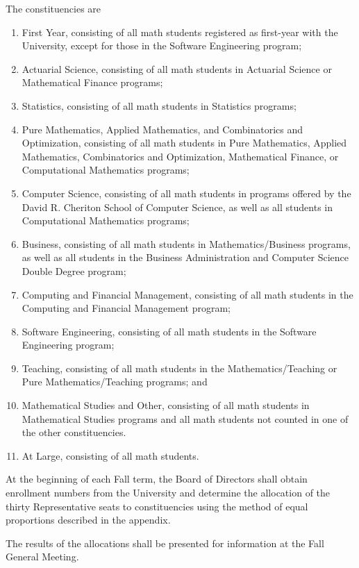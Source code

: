 The constituencies are
\begin{enumerate}
  \item First Year, consisting of all math students registered as first-year
    with the University, except for those in the Software Engineering program;
  \item Actuarial Science, consisting of all math students in Actuarial Science
    or Mathematical Finance programs;
  \item Statistics, consisting of all math students in Statistics programs;
  \item Pure Mathematics, Applied Mathematics, and Combinatorics and
    Optimization, consisting of all math students in Pure Mathematics, Applied
    Mathematics, Combinatorics and Optimization, Mathematical Finance, or
    Computational Mathematics programs;
  \item Computer Science, consisting of all math students in programs offered by
    the David R. Cheriton School of Computer Science, as well as all students in
    Computational Mathematics programs;
  \item Business, consisting of all math students in Mathematics/Business
    programs, as well as all students in the Business Administration and
    Computer Science Double Degree program;
  \item Computing and Financial Management, consisting of all math students in
    the Computing and Financial Management program;
  \item Software Engineering, consisting of all math students in the Software
    Engineering program;
  \item Teaching, consisting of all math students in the
    Mathematics/Teaching or Pure Mathematics/Teaching programs;
    and
  \item Mathematical Studies and Other, consisting of all math students in
    Mathematical Studies programs and all math students not counted in one of
    the other constituencies.
  \item At Large, consisting of all math students.  
\end{enumerate}

At the beginning of each Fall term, the Board of Directors shall obtain 
enrollment numbers from the University and determine the allocation of the
thirty Representative seats to constituencies using the method of equal
proportions described in the appendix.

The results of the allocations shall be presented for information at the 
Fall General Meeting.

